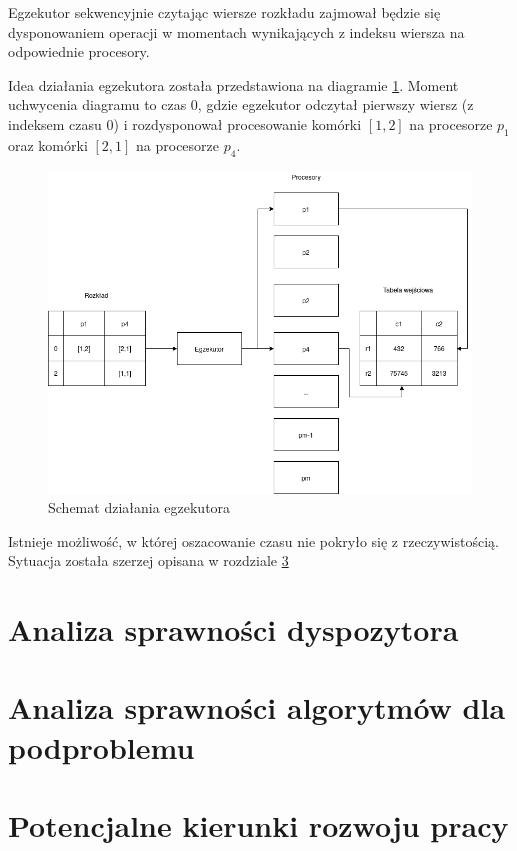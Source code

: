 \documentclass[brudnopis]{xmgr}
\begin{document}
Egzekutor sekwencyjnie czytając wiersze rozkładu zajmował będzie się dysponowaniem operacji w momentach wynikających z indeksu wiersza na odpowiednie procesory.

Idea działania egzekutora została przedstawiona na diagramie \ref{diag:executor}. Moment uchwycenia diagramu 
to czas 0, gdzie egzekutor odczytał pierwszy wiersz (z indeksem czasu 0) i rozdysponował procesowanie komórki $[1,2]$ na procesorze $p_1$ oraz komórki $[2,1]$ na procesorze $p_4$.

\begin{figure}[!tbh]
\centering
\includegraphics[width=.8\hsize]{fig/executor.png}
\caption{Schemat działania egzekutora\label{diag:executor}}
\end{figure}

Istnieje możliwość, w której oszacowanie czasu nie pokryło się z rzeczywistością. Sytuacja została szerzej opisana w rozdziale \ref{chap:extend}

\chapter{Analiza sprawności dyspozytora}


\chapter{Analiza sprawności algorytmów dla podproblemu}


\chapter{Potencjalne kierunki rozwoju pracy} \label{chap:extend}


\summary
\end{document}
